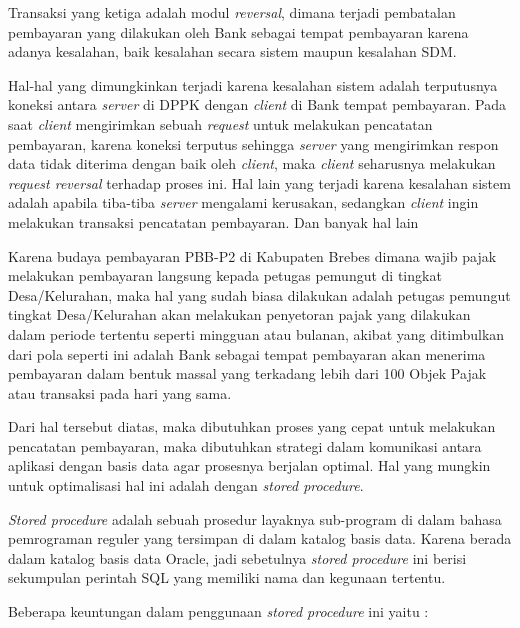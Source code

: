 \documentclass[pdftex,12pt, oneside]{article}
\begin{document}
Transaksi yang ketiga adalah modul \textit{reversal}, dimana terjadi pembatalan pembayaran yang dilakukan oleh Bank sebagai tempat pembayaran karena adanya kesalahan, baik kesalahan secara sistem maupun kesalahan SDM. 

Hal-hal yang dimungkinkan terjadi karena kesalahan sistem adalah terputusnya koneksi antara \textit{server} di DPPK dengan \textit{client} di Bank tempat pembayaran. Pada saat \textit{client} mengirimkan sebuah \textit{request} untuk melakukan pencatatan pembayaran, karena koneksi terputus sehingga \textit{server} yang mengirimkan respon data tidak diterima dengan baik oleh \textit{client}, maka \textit{client} seharusnya melakukan \textit{request reversal} terhadap proses ini. Hal lain yang terjadi karena kesalahan sistem adalah apabila tiba-tiba \textit{server} mengalami kerusakan, sedangkan \textit{client} ingin melakukan transaksi pencatatan pembayaran. Dan banyak hal lain 

Karena budaya pembayaran PBB-P2 di Kabupaten Brebes dimana wajib pajak melakukan pembayaran langsung kepada petugas pemungut di tingkat Desa/Kelurahan, maka hal yang sudah biasa dilakukan adalah petugas pemungut tingkat Desa/Kelurahan akan melakukan penyetoran pajak yang dilakukan dalam periode tertentu seperti mingguan atau bulanan, akibat yang ditimbulkan dari pola seperti ini adalah Bank sebagai tempat pembayaran akan menerima pembayaran dalam bentuk massal yang terkadang lebih dari 100 Objek Pajak atau transaksi pada hari yang sama. 

Dari hal tersebut diatas, maka dibutuhkan proses yang cepat untuk melakukan pencatatan pembayaran, maka dibutuhkan strategi dalam komunikasi antara aplikasi dengan basis data agar prosesnya berjalan optimal. Hal yang mungkin untuk optimalisasi hal ini adalah dengan \textit{stored procedure}.

\textit{Stored procedure} adalah sebuah prosedur layaknya sub-program di dalam bahasa pemrograman reguler yang tersimpan di dalam katalog basis data. Karena berada dalam katalog basis data Oracle, jadi sebetulnya \textit{stored procedure} ini berisi sekumpulan perintah SQL yang memiliki nama dan kegunaan tertentu.

Beberapa keuntungan dalam penggunaan \textit{stored procedure} ini yaitu :
\end{document}
